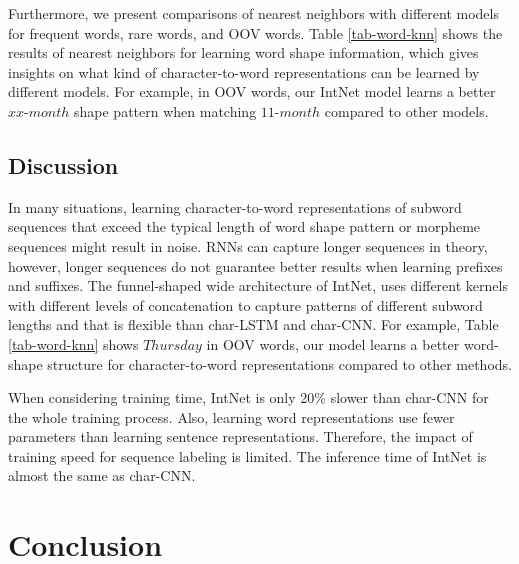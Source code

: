 \documentclass[11pt,a4paper]{article}
\begin{document}
Furthermore, we present comparisons of nearest neighbors with different models for frequent words, rare words, and OOV words. Table \ref{tab-word-knn} shows the results of nearest neighbors for learning word shape information, which gives insights on what kind of character-to-word representations can be learned by different models. For example, in OOV words, our IntNet model learns a better $xx$-$month$ shape pattern when matching $11$-$month$ compared to other models.

\subsection{Discussion}

In many situations, learning character-to-word representations of subword sequences that exceed the typical length of word shape pattern or morpheme sequences might result in noise. RNNs can capture longer sequences in theory, however, longer sequences do not guarantee better results when learning prefixes and suffixes. The funnel-shaped wide architecture of IntNet, uses different kernels with different levels of concatenation to capture patterns of different subword lengths and that is flexible than char-LSTM and char-CNN. For example, Table \ref{tab-word-knn} shows $Thursday$ in OOV words, our model learns a better word-shape structure for character-to-word representations compared to other methods.

When considering training time, IntNet is only 20\% slower than char-CNN for the whole training process. Also, learning word representations use fewer parameters than learning sentence representations. Therefore, the impact of training speed for sequence labeling is limited. The inference time of IntNet is almost the same as char-CNN.
 
\section{Conclusion}
\end{document}
